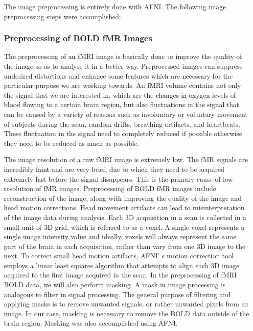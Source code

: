 \documentclass[12pt]{article}
\begin{document}
The image preprocessing is entirely done with AFNI.
The following image preprocessing steps were accomplished:

\subsubsection{Preprocessing of BOLD fMR Images}%
\label{ssub:preprocessing_of_bold_fmr_images}

The preprocessing of an fMRI image is basically done to improve the
quality of the image so as to analyse it in a better way.
Preprocessed images can suppress undesired distortions and enhance
some features which are necessary for the particular purpose we are
working towards. An fMRI volume contains not only the signal that we
are interested in, which are the  changes in oxygen levels of blood
flowing to a certain brain region, but also fluctuations in the signal
that can be caused by a variety of reasons such as involuntary or
voluntary movement of subjects during the scan, random drifts,
breathing artifacts, and heartbeats. These fluctuation in the signal
need to completely reduced if possible otherwise they need to be
reduced as much as possible.

The image resolution of a raw fMRI image is extremely low. The fMR
signals are incredibly faint and are very brief, due to which they
need to be acquired extremely fast before the signal disappears.  This
is the primary cause of low resolution of fMR images. Preprocessing of
BOLD fMR images include reconstruction of the image, along with
improving the quality of the image and head motion corrections.  Head
movement artifacts can lead to misinterpretation of the image data
during analysis.  Each 3D acquisition in a scan is collected in a
small unit of 3D grid, which is referred to as a voxel.  A single
voxel represents a single image intensity value and ideally, voxels
will always represent the same part of the brain in each acquisition,
rather than vary from one 3D image to the next. To correct small head
motion artifacts, AFNI' s motion correction tool employs a linear
least squares algorithm that attempts to align each 3D image acquired
to the first image acquired in the scan. In the preprocessing of fMRI
BOLD data, we will also perform masking. A mask in image processing
is analogous to filter in signal processing. The general purpose of
filtering and applying masks is to remove unwanted signals, or rather
unwanted pixels from an image. In our case, masking is necessary to
remove the BOLD data outside of the brain region. Masking was also
accomplished using AFNI.
\end{document}
